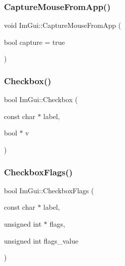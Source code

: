 \mbox{\label{namespace_im_gui_a3a86fbf0d334b30dc16fb44955f1ce54}} 
\subsubsection{\texorpdfstring{Capture\+Mouse\+From\+App()}{CaptureMouseFromApp()}}
{\footnotesize\ttfamily void Im\+Gui\+::\+Capture\+Mouse\+From\+App (\begin{DoxyParamCaption}\item[{bool}]{capture = {\ttfamily true} }\end{DoxyParamCaption})}

\mbox{\label{namespace_im_gui_a57d73c1d0ef807fef734d91024092027}} 
\subsubsection{\texorpdfstring{Checkbox()}{Checkbox()}}
{\footnotesize\ttfamily bool Im\+Gui\+::\+Checkbox (\begin{DoxyParamCaption}\item[{const char $\ast$}]{label,  }\item[{bool $\ast$}]{v }\end{DoxyParamCaption})}

\mbox{\label{namespace_im_gui_aeca400dcf5a82c312b3e669d2fe6e88d}} 
\subsubsection{\texorpdfstring{Checkbox\+Flags()}{CheckboxFlags()}}
{\footnotesize\ttfamily bool Im\+Gui\+::\+Checkbox\+Flags (\begin{DoxyParamCaption}\item[{const char $\ast$}]{label,  }\item[{unsigned int $\ast$}]{flags,  }\item[{unsigned int}]{flags\+\_\+value }\end{DoxyParamCaption})}

\mbox{\label{namespace_im_gui_a17ff60ad1e2669130ac38a04d16eb354}} 
